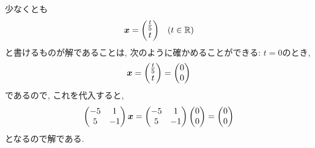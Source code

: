 \begin{checkanswer}%
  少なくとも
  \begin{align*}
    \boldsymbol{x}=\begin{pmatrix}\frac{t}{5}\\t\end{pmatrix} && (t\in\mathbb{R})
  \end{align*}
  と書けるものが解であることは,
  次のように確かめることができる:
  $t=0$のとき,
  \begin{align*}
    \boldsymbol{x}=\begin{pmatrix}\frac{t}{5}\\t\end{pmatrix}=\begin{pmatrix}0\\0\end{pmatrix}
  \end{align*}
  であるので, これを代入すると,
  \begin{align*}
    \begin{pmatrix}-5&1\\5&-1\end{pmatrix}\boldsymbol{x}
     =
    \begin{pmatrix}-5&1\\5&-1\end{pmatrix}\begin{pmatrix}0\\0\end{pmatrix}
     =
    \begin{pmatrix}0\\0\end{pmatrix}
  \end{align*}
  となるので解である.


\end{checkanswer}
